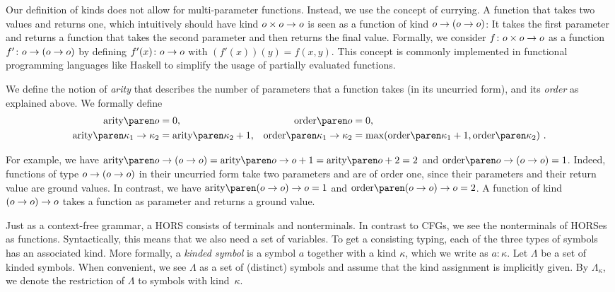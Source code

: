 \documentclass[../../diss.tex]{subfiles}
\begin{document}
Our definition of kinds does not allow for multi-parameter functions.
Instead, we use the concept of currying.
A function that takes two values and returns one, which intuitively should have kind $o \times o \to o$ is seen as a function of kind $o \to (o \to o)$:
It takes the first parameter and returns a function that takes the second parameter and then returns the final value.
Formally, we consider $f \colon o \times o \to o$ as a function $f' \colon o \to (o \to o)$ by defining $f'(x) \colon o \to o$ with $(f'(x))(y) = f(x,y)$.
This concept is commonly implemented in functional programming languages like Haskell to simplify the usage of partially evaluated functions.

We define the notion of \emph{arity} that describes the number of parameters that a function takes (in its uncurried form), and its \emph{order} as explained above.
We formally define
\begin{align*}
        \horsarity{\ground} &= 0,
        & \horsorder{\ground} &= 0,\\
        \horsarity{\kappa_1 \to \kappa_2} &= \horsarity{\kappa_2}+1,
        & \horsorder{\kappa_1 \to \kappa_2} &= \max(\horsorder{\kappa_1} +1, \horsorder{\kappa_2})\ .
\end{align*}

For example, we have $\horsarity{\ground \to (\ground \to \ground)} = \horsarity{\ground \to \ground} + 1 = \horsarity{\ground} + 2 = 2$ and $\horsorder{\ground \to (\ground \to \ground)} = 1$.
Indeed, functions of type $o \to (o \to o)$ in their uncurried form take two parameters and are of order one, since their parameters and their return value are ground values.
In contrast, we have $\horsarity{(\ground \to \ground) \to \ground} = 1$ and $\horsorder{(\ground \to \ground) \to \ground} = 2$.
A function of kind $(o \to o) \to o$ takes a function as parameter and returns a ground value.


Just as a context-free grammar, a HORS consists of terminals and nonterminals.
In contrast to CFGs, we see the nonterminals of HORSes as functions.
Syntactically, this means that we also need a set of variables.
%
To get a consisting typing, each of the three types of symbols has an associated kind.
More formally, a \emph{kinded symbol} is a symbol $a$ together with a kind $\kappa$, which we write as $a \colon \kappa$.
Let $\Lambda$ be a set of kinded symbols.
When convenient, we see $\Lambda$ as a set of (distinct) symbols and assume that the kind assignment is implicitly given.
By $\Lambda_\kappa$, we denote the restriction of $\Lambda$ to symbols with kind~$\kappa$.
\end{document}
